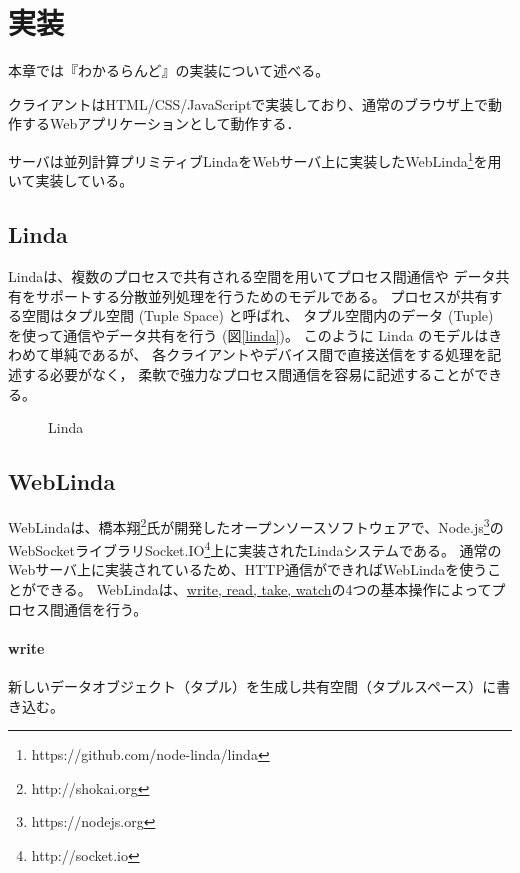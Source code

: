 \section{実装}
本章では『わかるらんど』の実装について述べる。

クライアントはHTML/CSS/JavaScriptで実装しており、通常のブラウザ上で動作するWebアプリケーションとして動作する．

サーバは並列計算プリミティブLindaをWebサーバ上に実装したWebLinda\footnote{https://github.com/node-linda/linda}を用いて実装している。

\subsection{Linda}
Lindaは、複数のプロセスで共有される空間を用いてプロセス間通信や
データ共有をサポートする分散並列処理を行うためのモデルである。
プロセスが共有する空間はタプル空間 (Tuple Space) と呼ばれ、
タプル空間内のデータ (Tuple) を使って通信やデータ共有を行う (図\ref{linda})。
このように Linda のモデルはきわめて単純であるが、
各クライアントやデバイス間で直接送信をする処理を記述する必要がなく，
柔軟で強力なプロセス間通信を容易に記述することができる。

\begin{figure}[h]
\centering
{}
\caption{Linda}
\label{button}
\end{figure}

\subsection{WebLinda}
WebLindaは、橋本翔\footnote{http://shokai.org}氏が開発したオープンソースソフトウェアで、Node.js\footnote{https://nodejs.org}のWebSocketライブラリSocket.IO\footnote{http://socket.io}上に実装されたLindaシステムである。
通常のWebサーバ上に実装されているため、HTTP通信ができればWebLindaを使うことができる。
WebLindaは、\url{write, read, take, watch}の4つの基本操作によってプロセス間通信を行う。

\paragraph*{write}
新しいデータオブジェクト（タプル）を生成し共有空間（タプルスペース）に書き込む。

